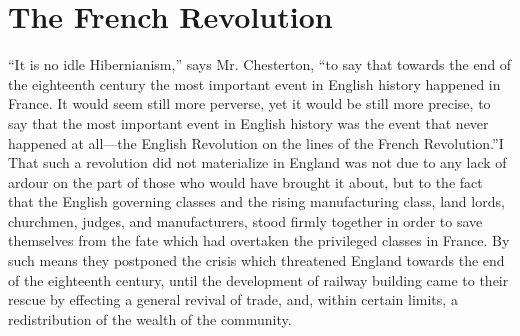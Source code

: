 \documentclass{book}
\begin{document}
\chapter{The French Revolution}
\label{chapter-13}
“It is no idle Hibernianism,” says Mr. Chesterton, “to say that towards the end of the eighteenth century the most important event in English history happened in France. It would seem still more perverse, yet it would be still more precise, to say that the most important event in English history was the event that never happened at all—the English Revolution on the lines of the French Revolution.”\footnotemark[1] I That such a revolution did not materialize in England was not due to any lack of ardour on the part of those who would have brought it about, but to the fact that the English governing classes and the rising manufacturing class, land lords, churchmen, judges, and manufacturers, stood firmly together in order to save themselves from the fate which had overtaken the privileged classes in France. By such means they postponed the crisis which threatened England towards the end of the eighteenth century, until the development of railway building came to their rescue by effecting a general revival of trade, and, within certain limits, a redistribution of the wealth of the community.
\end{document}
